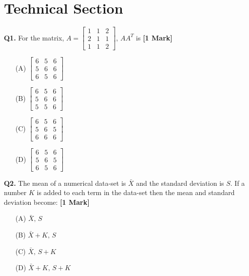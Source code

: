 \documentclass[11pt]{article}
\newcommand{\questiona}[2]{
    \noindent\textbf{Q#2.} #1 \hfill \textbf{[1 Mark]}
}
\begin{document}
\section*{Technical Section}

\questiona{For the matrix, \( A = \begin{bmatrix} 1 & 1 & 2 \\ 2 & 1 & 1 \\ 1 & 1 & 2 \end{bmatrix} \), \( AA^T \) is}{1}
\begin{enumerate}
    \item[(A)] \(\begin{bmatrix} 6 & 5 & 6 \\ 5 & 6 & 6 \\ 6 & 5 & 6 \end{bmatrix}\)
    \item[(B)] \(\begin{bmatrix} 6 & 5 & 6 \\ 5 & 6 & 6 \\ 5 & 5 & 6 \end{bmatrix}\)
    \item[(C)] \(\begin{bmatrix} 6 & 5 & 6 \\ 5 & 6 & 5 \\ 6 & 6 & 6 \end{bmatrix}\)
    \item[(D)] \(\begin{bmatrix} 6 & 5 & 6 \\ 5 & 6 & 5 \\ 6 & 5 & 6 \end{bmatrix}\)
\end{enumerate}
\vspace{0.5cm}

\questiona{The mean of a numerical data-set is \( \bar{X} \) and the standard deviation is \( S \). If a number \( K \) is added to each term in the data-set then the mean and standard deviation become:}{2}
\begin{enumerate}
    \item[(A)] \( \bar{X}, \, S \)
    \item[(B)] \( \bar{X} + K, \, S \)
    \item[(C)] \( \bar{X}, \, S + K \)
    \item[(D)] \( \bar{X} + K, \, S + K \)
\end{enumerate}
\vspace{0.5cm}
\end{document}
